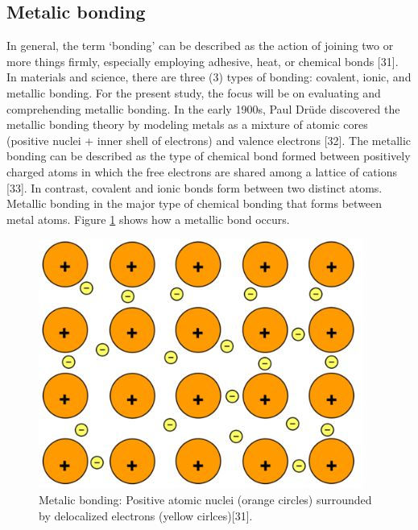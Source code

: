 \documentclass[12pt]{report}
\begin{document}
\subsection{Metalic bonding}
In general, the term ‘bonding’ can be described as the action of joining two or more things firmly, especially employing adhesive, heat, or chemical bonds [31]. In materials and science, there are three (3) types of bonding: covalent, ionic, and metallic bonding. For the present study, the focus will be on evaluating and comprehending metallic bonding.
In the early 1900s, Paul Drüde discovered the metallic bonding theory by modeling metals as a mixture of atomic cores (positive nuclei + inner shell of electrons) and valence electrons [32]. The metallic bonding can be described as the type of chemical bond formed between positively charged atoms in which the free electrons are shared among a lattice of cations [33]. In contrast, covalent and ionic bonds form between two distinct atoms. Metallic bonding in the major type of chemical bonding that forms between metal atoms. Figure \ref{ch3:figure:bonding} shows how a metallic bond occurs.

\begin{figure}[H]
    \centering
    \includegraphics[width=.5\textwidth]{metalic_bonding.jpg}
    \caption{Metalic bonding: Positive atomic nuclei (orange circles) surrounded by delocalized electrons (yellow cirlces)[31].}
    \label{ch3:figure:bonding}
\end{figure}
\end{document}
